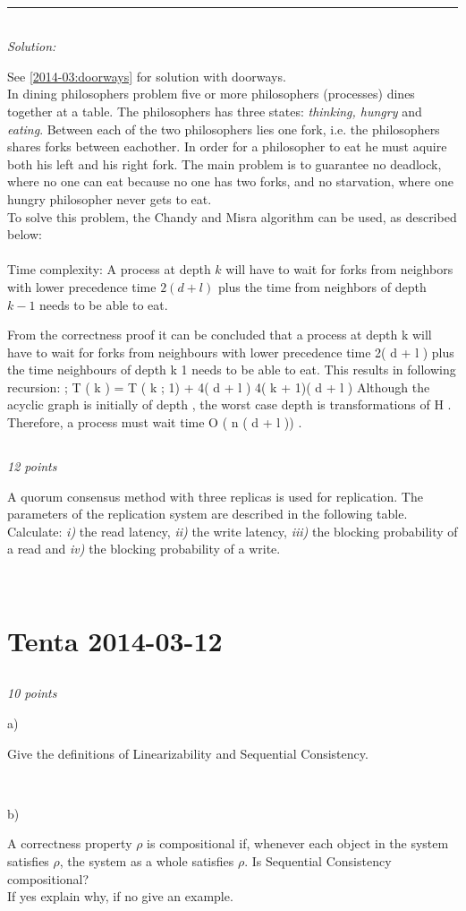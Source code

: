 \documentclass[a4paper]{article}
\newcommand{\horrule}[1]{\rule{\linewidth}{#1}} %
\newcommand{\points}[1]{\subsection{} \textit{#1 points}\\}
\newcommand{\question}[2][]{
  \noindent
  \parbox[t]{\textwidth}{#1 \parbox[t]{0.95\textwidth}{#2}}\\
}
\newcommand{\solution}[1]{\\\horrule{0.5pt}\\[3pt]\textit{Solution: }\\[0.1cm]\begin{minipage}{\textwidth}#1\end{minipage}}
\begin{document}
%
\solution{
  See \ref{2014-03:doorways} for solution with doorways.\\ 
  In dining philosophers problem five or more philosophers (processes) dines
  together at a table. The philosophers has three states: \textit{thinking, hungry} and \textit{eating}.
  Between each of the two philosophers lies one fork, i.e. the philosophers shares forks between eachother.
  In order for a philosopher to eat he must aquire both his left and his right fork. The main problem is to
  guarantee no deadlock, where no one can eat because no one has two forks, and no starvation, where one
  hungry philosopher never gets to eat.\\
  To solve this problem, the Chandy and Misra algorithm can be used, as described below:\\\\
  \usebox{\userinput}
  Time complexity:
  A process at depth $k$ will have to wait for forks from neighbors with lower precedence time $2(d+l)$
  plus the time from neighbors of depth $k-1$ needs to be able to eat.

From the correctness proof it can be concluded that a process at depth k will have
to wait for forks from neighbours with lower precedence time 2( d + l ) plus the time
neighbours of depth k 1 needs to be able to eat. This results in following recursion:
;
T ( k ) = T ( k ; 1) + 4( d + l )
4( k + 1)( d + l )
Although the acyclic graph is initially of depth , the worst case depth is
transformations of H . Therefore, a process must wait time O ( n ( d + l )) .

}


\points{12}
\question{
  A quorum consensus method with three replicas is used for
  replication. The parameters of the replication system are described in
  the following table. Calculate: \textit{i)} the read latency,
  \textit{ii)} the write latency, \textit{iii)} the blocking probability
  of a read and \textit{iv)} the blocking probability of a write.
}



\section{Tenta 2014-03-12}
\points{10}
\label{2014-03:linearizability}
\question[a)]{
  Give the definitions of Linearizability and Sequential Consistency.
}
\question[b)]{
  A correctness property $\rho$ is compositional if, whenever
  each object in the system satisfies $\rho$, the system as a whole
  satisfies $\rho$. Is Sequential Consistency compositional? \\
  If yes explain why, if no give an example.
}
\end{document}
